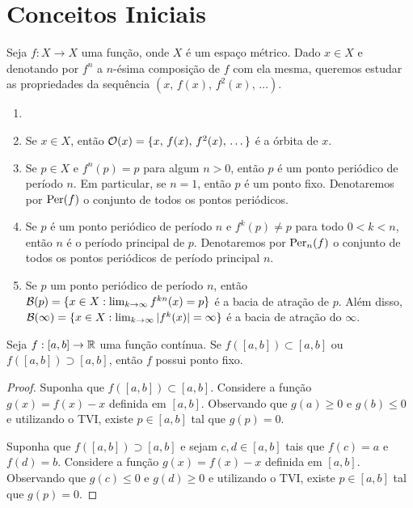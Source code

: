 \section{Conceitos Iniciais}

Seja $f: X \to X$ uma função, onde $X$ é um espaço métrico.
Dado $x \in X$ e denotando por $f^n$ a $n$-ésima composição de $f$ com ela mesma, queremos estudar as propriedades da sequência $(x, \, f(x), \, f^2(x), \, \dots)$.

\begin{definition}
\begin{enumerate}[label = \alph*.]
\item[]

\item Se $x \in X$, então $\mathcal{O}(x) = \{ x, \, f(x), \, f^2(x), \, \dots \}$ é a órbita de $x$.

\item Se $p \in X$ e $f^n(p) = p$ para algum $n > 0$, então $p$ é um ponto periódico de período $n$. Em particular, se $n = 1$, então $p$ é um ponto fixo. Denotaremos por $\operatorname{Per}(f)$ o conjunto de todos os pontos periódicos.

\item Se $p$ é um ponto periódico de período $n$ e $f^k(p) \neq p$ para todo $0 < k < n$, então $n$ é o período principal de $p$. Denotaremos por $\operatorname{Per}_n(f)$ o conjunto de todos os pontos periódicos de período principal $n$.

\item Se $p$ um ponto periódico de período $n$, então $\mathcal{B}(p) = \{ x \in  X: \lim_{k \to \infty} f^{kn}(x) = p \}$ é a bacia de atração de $p$. Além disso, $\mathcal{B}(\infty) = \{ x \in  X: \lim_{k \to \infty} |f^k(x)| = \infty \}$ é a bacia de atração do $\infty$.
\end{enumerate}
\end{definition}

\begin{proposition} \label{prop 1-1}
Seja $f: [a, b] \to \mathbb{R}$ uma função contínua. Se $f([a, b]) \subset [a, b]$ ou $f([a, b]) \supset [a, b]$, então $f$ possui ponto fixo.
\end{proposition}

\begin{proof}
Suponha que $f([a, b]) \subset [a, b]$. Considere a função $g(x) = f(x) - x$ definida em $[a, b]$. Observando que $g(a) \geq 0$ e $g(b) \leq 0$ e utilizando o TVI, existe $p \in [a, b]$ tal que $g(p) = 0$.

Suponha que $f([a, b]) \supset [a, b]$ e sejam $c, d \in [a, b]$ tais que $f(c) = a$ e $f(d) = b$. Considere a função $g(x) = f(x) - x$ definida em $[a, b]$. Observando que $g(c) \leq 0$ e $g(d) \geq 0$ e utilizando o TVI, existe $p \in [a, b]$ tal que $g(p) = 0$.
\end{proof}


